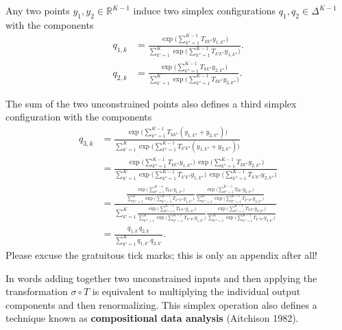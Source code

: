 \documentclass[
  letterpaper,
  DIV=11,
  numbers=noendperiod]{scrartcl}
\begin{document}
Any two points \(y_{1}, y_{2} \in \mathbb{R}^{K - 1}\) induce two
simplex configurations \(q_{1}, q_{2} \in \Delta^{K - 1}\) with the
components \begin{align*}
q_{1, k}
&=
\frac{ \exp \big( \sum_{k'' = 1}^{K - 1} T_{kk''} y_{1, k''} \big) }
{ \sum_{k' = 1}^{K} \exp \big( \sum_{k'' = 1}^{K - 1} T_{k'k''} y_{1, k''} \big) }.
\\
q_{2, k}
&=
\frac{ \exp \big( \sum_{k'' = 1}^{K - 1} T_{kk''} y_{2, k''} \big) }
{ \sum_{k' = 1}^{K} \exp \big( \sum_{k'' = 1}^{K - 1} T_{kk''} y_{2, k''} \big) }.
\end{align*}

The sum of the two unconstrained points also defines a third simplex
configuration with the components \begin{align*}
q_{3, k}
&=
\frac{
\exp \big( \sum_{k'' = 1}^{K - 1} T_{kk''} (y_{1, k''} + y_{2, k''}) \big)
}{
\sum_{k' = 1}^{K}
\exp \big( \sum_{k'' = 1}^{K - 1} T_{k'k''} (y_{1, k''} + y_{2, k''}) \big) }
\\
&=
\frac{
\exp \big( \sum_{k'' = 1}^{K - 1} T_{kk''} y_{1, k''} \big) \,
\exp \big( \sum_{k'' = 1}^{K - 1} T_{kk''} y_{2, k''} \big)
}{
\sum_{k' = 1}^{K}
\exp \big( \sum_{k'' = 1}^{K - 1} T_{k'k''} y_{1, k''} \big) \,
\exp \big( \sum_{k'' = 1}^{K - 1} T_{k'k''} y_{2, k''} \big)
}
\\
&=
\frac{
\frac{
\exp \big( \sum_{k'' = 1}^{K - 1} T_{kk''} y_{1, k''} \big)
}{
\sum_{k''' = 1}^{K} \exp \big( \sum_{k'' = 1}^{K - 1} T_{k'''k''} y_{1, k''} \big)
}
\frac{
\exp \big( \sum_{k'' = 1}^{K - 1} T_{kk''} y_{2, k''} \big)
}{
\sum_{k''' = 1}^{K} \exp \big( \sum_{k'' = 1}^{K - 1} T_{k'''k''} y_{2, k''} \big)
}
}{
\sum_{k' = 1}^{K}
\frac{
\exp \big( \sum_{k'' = 1}^{K - 1} T_{k'k''} y_{1, k''} \big)
}{
\sum_{k''' = 1}^{K} \exp \big( \sum_{k'' = 1}^{K - 1} T_{k'''k''} y_{1, k''} \big)
}
\frac{
\exp \big( \sum_{k'' = 1}^{K - 1} T_{k'k''} y_{2, k''} \big)
}{
\sum_{k''' = 1}^{K} \exp \big( \sum_{k'' = 1}^{K - 1} T_{k'''k''} y_{2, k''} \big)
}
}
\\
&=
\frac{ q_{1, k} \, q_{2, k} }
{ \sum_{k' = 1}^{K} q_{1, k'} \, q_{2, k'} }.
\end{align*} Please excuse the gratuitous tick marks; this is only an
appendix after all!

In words adding together two unconstrained inputs and then applying the
transformation \(\sigma \circ T\) is equivalent to multiplying the
individual output components and then renormalizing. This simplex
operation also defines a technique known as \textbf{compositional data
analysis} (Aitchison 1982).
\end{document}
